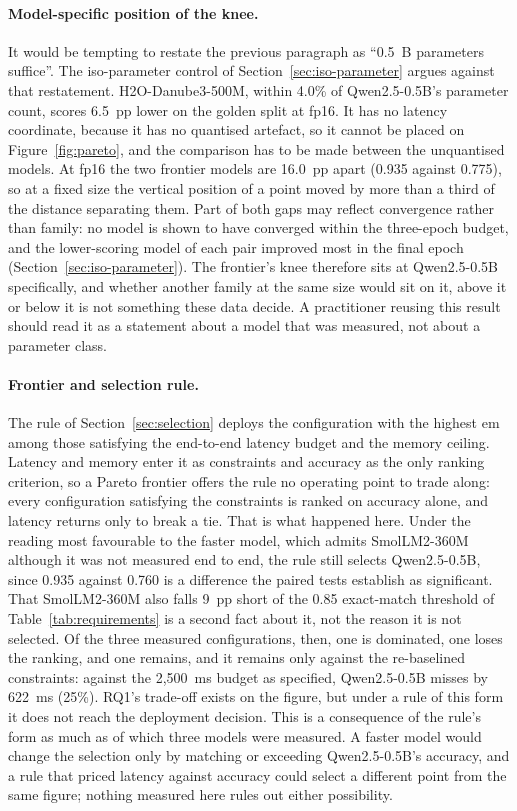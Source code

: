 \paragraph{Model-specific position of the knee.} It would be tempting to restate the
previous paragraph as ``0.5~B parameters suffice''. The iso-parameter control of
Section~\ref{sec:iso-parameter} argues against that restatement. H2O-Danube3-500M, within 4.0\% of
Qwen2.5-0.5B's parameter count, scores 6.5~pp lower on the golden split at fp16. It has no latency
coordinate, because it has no quantised artefact, so it cannot be placed on
Figure~\ref{fig:pareto}, and the comparison has to be made between the unquantised models. At fp16
the two frontier models are 16.0~pp apart (0.935 against 0.775), so at a fixed size the vertical
position of a point moved by more than a third of the distance separating them. Part of both gaps
may reflect convergence rather than family: no model is shown to have converged within the
three-epoch budget, and the lower-scoring model of each pair improved most in the final epoch
(Section~\ref{sec:iso-parameter}). The frontier's knee
therefore sits at Qwen2.5-0.5B specifically, and whether another family at the same size would sit
on it, above it or below it is not something these data decide. A practitioner reusing this result
should read it as a statement about a model that was measured, not about a parameter class.

\paragraph{Frontier and selection rule.} The rule of Section~\ref{sec:selection} deploys the
configuration with the highest \gls{em} among those satisfying the end-to-end latency budget and the
memory ceiling. Latency and memory enter it as constraints and accuracy as the only ranking
criterion, so a Pareto frontier offers the rule no operating point to trade along: every
configuration satisfying the constraints is ranked on accuracy alone, and latency returns only to
break a tie. That is what happened here. Under the reading most favourable to the faster model,
which admits SmolLM2-360M although it was not measured end to end, the rule still selects
Qwen2.5-0.5B, since 0.935 against 0.760 is a difference the paired tests establish as significant.
That SmolLM2-360M also falls 9~pp short of the 0.85 exact-match threshold of
Table~\ref{tab:requirements} is a second fact about it, not the reason it is not selected. Of the
three measured configurations, then, one is dominated, one loses the ranking, and one remains, and
it remains only against the re-baselined constraints: against the 2{,}500~ms budget as specified,
Qwen2.5-0.5B misses by 622~ms (25\%). RQ1's trade-off exists on the figure, but under a rule of this
form it does not reach the deployment decision. This is a consequence of the rule's form as much as
of which three models were measured. A faster model would change the selection only by matching or
exceeding Qwen2.5-0.5B's accuracy, and a rule that priced latency against accuracy could select a
different point from the same figure; nothing measured here rules out either possibility.

